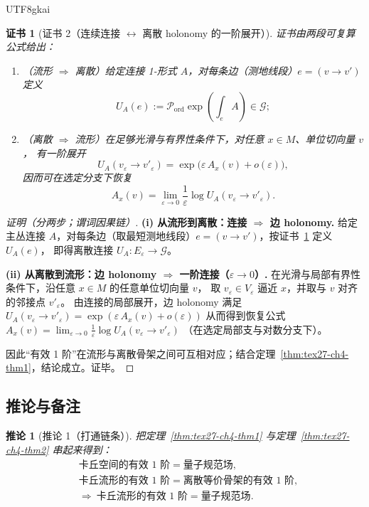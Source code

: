 \documentclass[12pt]{article}
\newtheorem{corollary}{推论}[section]
\newtheorem{Certificate}{证书}[section]
\begin{document}
\begin{CJK*}{UTF8}{gkai}
\begin{Certificate}[证书 2（连续连接 $\leftrightarrow$ 离散 holonomy 的一阶展开）]
\label{cert:tex27-ch4-thm2}
证书由两段可复算公式给出：
\begin{enumerate}
  \item（流形 $\Rightarrow$ 离散）给定连接 1-形式 $A$，对每条边（测地线段）$e=(v\to v')$ 定义
  \[
    U_A(e):=\mathcal{P}_{\mathrm{ord}}\exp\!\left(\int_{e}A\right)\in\mathcal{G};
  \]
  \item（离散 $\Rightarrow$ 流形）在足够光滑与有界性条件下，对任意 $x\in M$、单位切向量 $v$，
  有一阶展开
  \[
    U_A(v_\varepsilon\to v'_\varepsilon)=\exp\!\big(\varepsilon\,A_x(v)+o(\varepsilon)\big),
  \]
  因而可在选定分支下恢复
  \[
    A_x(v)=\lim_{\varepsilon\to 0}\frac{1}{\varepsilon}\log U_A(v_\varepsilon\to v'_\varepsilon).
  \]
\end{enumerate}
\end{Certificate}

\begin{proof}[证明（分两步；谓词因果链）]
\textbf{(i) 从流形到离散：连接 $\Rightarrow$ 边 holonomy.}
给定主丛连接 $A$，对每条边（取最短测地线段）$e=(v\to v')$，按证书~\ref{cert:tex27-ch4-thm2} 定义 $U_A(e)$，
即得离散连接 $U_A:E_\varepsilon\to \mathcal{G}$。

\textbf{(ii) 从离散到流形：边 holonomy $\Rightarrow$ 一阶连接（$\varepsilon\to 0$）.}
在光滑与局部有界性条件下，沿任意 $x\in M$ 的任意单位切向量 $v$，
取 $v_\varepsilon\in V_\varepsilon$ 逼近 $x$，并取与 $v$ 对齐的邻接点 $v'_\varepsilon$。
由连接的局部展开，边 holonomy 满足
$
U_A(v_\varepsilon\to v'_\varepsilon)=\exp(\varepsilon\,A_x(v)+o(\varepsilon))
$
从而得到恢复公式
$
A_x(v)=\lim_{\varepsilon\to 0}\frac{1}{\varepsilon}\log U_A(v_\varepsilon\to v'_\varepsilon)
$
（在选定局部支与对数分支下）。

因此“有效 1 阶”在流形与离散骨架之间可互相对应；结合定理~\ref{thm:tex27-ch4-thm1}，结论成立。证毕。
\end{proof}

\subsection{推论与备注}
\label{subsec:tex27-ch4-others}

\begin{corollary}[推论 1（打通链条）]
\label{cor:tex27-ch4-cor1}
把定理~\ref{thm:tex27-ch4-thm1} 与定理~\ref{thm:tex27-ch4-thm2} 串起来得到：
\[
  \boxed{\begin{aligned}
    &\text{卡丘空间的有效 1 阶}=\text{量子规范场},\\
    &\text{卡丘流形的有效 1 阶}=\text{离散等价骨架的有效 1 阶},\\
    &\Rightarrow\ \text{卡丘流形的有效 1 阶}=\text{量子规范场}.
  \end{aligned}}
\]
\end{corollary}


\end{CJK*}
\end{document}
